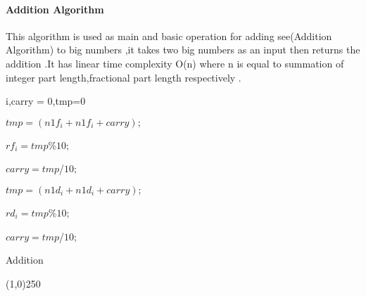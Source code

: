 \paragraph{Addition Algorithm}
This algorithm is used as main and basic operation for adding see(Addition Algorithm) to big numbers ,it takes two big numbers as an input then returns the addition .It has linear time complexity O(n) where n is equal to summation of integer part length,fractional part length respectively . 
\newline\newline\newline\newline\newline\newline\newline\newline\newline
\begin{algorithm}[H]
	\SetAlgoLined
	i,carry = 0,tmp=0\;

	{
		
		$tmp = (n1f_{i} + n1f_{i} + carry);$
		
		$rf_{i} =  tmp $\%$ 10;$ 
		
		$carry = tmp $/$ 10;$
	}

	{
		
		$tmp = (n1d_{i} + n1d_{i} + carry);$
		
		$rd_{i} =  tmp $\%$ 10;$ 
		
		$carry = tmp $/$ 10;$
	}
	\caption{Addition}
	\label{Addition_Algorithm}
\end{algorithm}



\newpage
\begin{center}
	\line(1,0){250}
\end{center}

